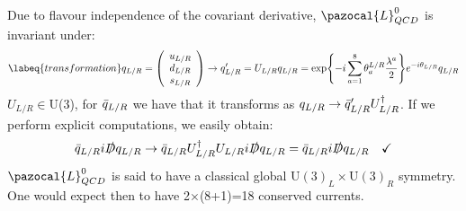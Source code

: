 \documentclass[../main.tex]{subfiles}
\begin{document}
Due to flavour independence of the covariant derivative, $\pazocal{L}_{QCD}^0$ is invariant under:
\begin{equation}
\labeq{transformation}
q_{L/R}=\left(\begin{array}{c}
    u_{L/R}\\
    d_{L/R}\\
    s_{L/R}
\end{array}\right)\to q_{L/R}'=U_{L/R}q_{L/R}=\exp{-i\sum_{a=1}^8\theta_a^{L/R}\frac{\lambda^a}{2}}e^{-i\theta_{L/R}}q_{L/R}
\end{equation}
$U_{L/R}\in$U(3), for $\Bar{q}_{L/R}$ we have that it transforms as $q_{L/R}\to\Bar{q}_{L/R}'U_{L/R}^\dagger$. If we perform explicit computations, we easily obtain:
\[
\Bar{q}_{L/R}i\slashed{D}q_{L/R}\to\Bar{q}_{L/R}U_{L/R}^\dagger U_{L/R}i\slashed{D}q_{L/R}=\Bar{q}_{L/R}i\slashed{D}q_{L/R} \quad \checkmark
\]
$\pazocal{L}_{QCD}^0$ is said to have a classical global U$(3)_L\times$U$(3)_R$ symmetry. One would expect then to have 2$\times$(8+1)=18 conserved currents.
\end{document}
